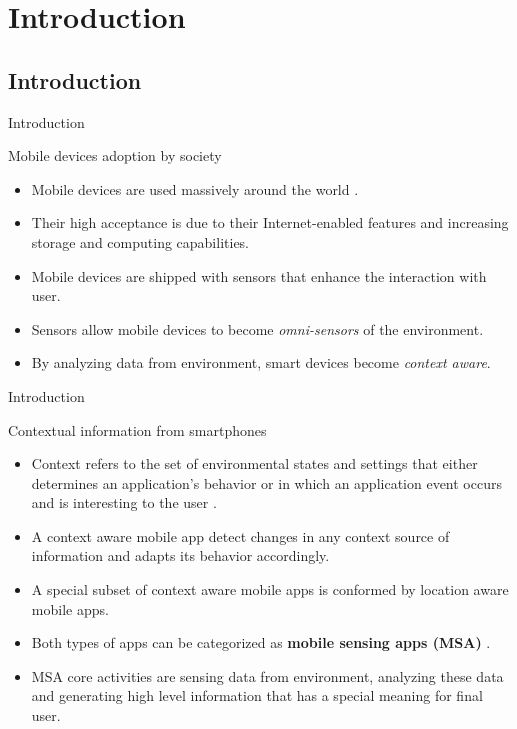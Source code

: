 \section{Introduction}

\subsection{Introduction}

\begin{frame}{Introduction}
  \begin{block}{Mobile devices adoption by society}
    \begin{itemize}
      \item Mobile devices are used massively around the world \citep{Qureshi2014}.
      \item Their high acceptance is due to their Internet-enabled features and increasing storage and computing capabilities.
      \item Mobile devices are shipped with sensors that enhance the interaction with user.
      \item Sensors allow mobile devices to become \emph{omni-sensors} of the environment.
      \item By analyzing data from environment, smart devices become \emph{context aware}.
    \end{itemize}
  \end{block}
\end{frame}

\begin{frame}{Introduction}
  \begin{block}{Contextual information from smartphones}
    \begin{itemize}
      \item Context refers to the set of environmental states and settings that either determines an application’s behavior or in which an application event occurs and is interesting to the user \citep{Chen2000}.
      \item A context aware mobile app detect changes in any context source of information and adapts its behavior accordingly.
      \item A special subset of context aware mobile apps is conformed by location aware mobile apps.
      \item Both types of apps can be categorized as \textbf{mobile sensing apps (MSA)} \citep{Lane2010,Campbell2012}.
      \item MSA core activities are sensing data from environment, analyzing these data and generating high level information that has a special meaning for final user.
    \end{itemize}
  \end{block}
\end{frame}

